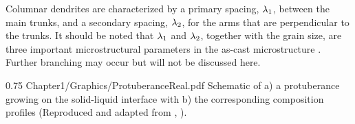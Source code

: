 Columnar dendrites are characterized by a primary spacing, ${\lambda}_{1}$, between the main trunks, and a secondary spacing, ${\lambda}_{2}$, for the arms that are perpendicular
to the trunks. It should be noted that ${\lambda}_{1}$ and ${\lambda}_{2}$, together with the grain size, are three important microstructural parameters in the as-cast microstructure \citep{easton_grain_2011}.
Further branching may occur but will not be discussed here.
\begin{figureth}
{0.75}
{Chapter1/Graphics/ProtuberanceReal.pdf} %
{Schematic of a) a protuberance growing on the solid-liquid interface with b) the corresponding composition profiles 
(Reproduced and adapted from \citet{doitpoms_dissemination_2000}, \doitpoms).}
\label{fig:dendritic_growth}
\end{figureth}
